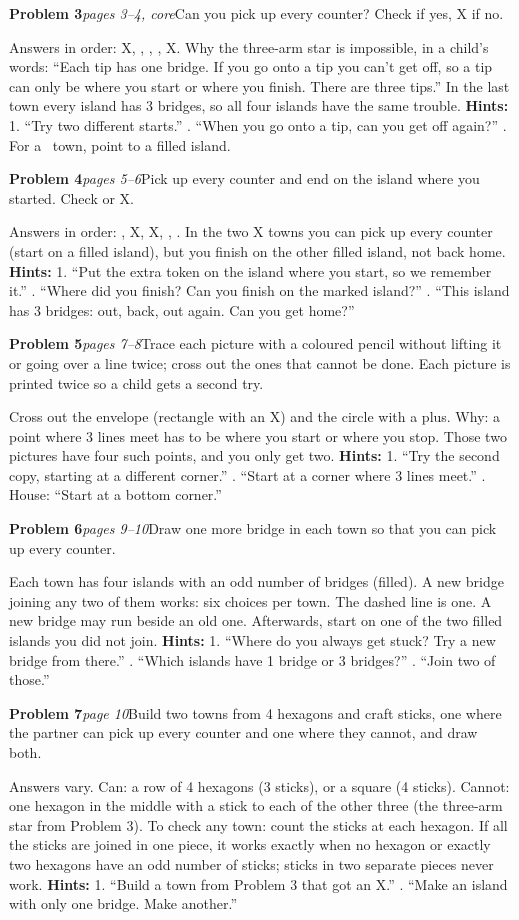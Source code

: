 \documentclass[10pt]{article}
\newcommand{\kprob}[3]{\par\needspace{14\baselineskip}\vspace{3pt}\noindent\textbf{#1}\enspace\textit{#2}\enspace #3\par}
\newcommand{\hints}[1]{\noindent\textbf{Hints:} #1\par}
\newcommand{\ck}{\checkmark}
\begin{document}
\kprob{Problem 3}{pages 3--4, core}{Can you pick up every counter? Check if yes, X if no.}

Answers in order: X, \ck, \ck, \ck, X. Why the three-arm star is impossible, in a child's words: ``Each tip has one bridge. If you go onto a tip you can't get off, so a tip can only be where you start or where you finish. There are three tips.'' In the last town every island has 3 bridges, so all four islands have the same trouble.
\hints{1. ``Try two different starts.'' . ``When you go onto a tip, can you get off again?'' \;3. For a \ck\ town, point to a filled island.}

\kprob{Problem 4}{pages 5--6}{Pick up every counter and end on the island where you started. Check or X.}

Answers in order: \ck, X, X, \ck, \ck. In the two X towns you can pick up every counter (start on a filled island), but you finish on the other filled island, not back home.
\hints{1. ``Put the extra token on the island where you start, so we remember it.'' \;2. ``Where did you finish? Can you finish on the marked island?'' \;3. ``This island has 3 bridges: out, back, out again. Can you get home?''}

\kprob{Problem 5}{pages 7--8}{Trace each picture with a coloured pencil without lifting it or going over a line twice; cross out the ones that cannot be done. Each picture is printed twice so a child gets a second try.}

Cross out the envelope (rectangle with an X) and the circle with a plus. Why: a point where 3 lines meet has to be where you start or where you stop. Those two pictures have four such points, and you only get two.
\hints{1. ``Try the second copy, starting at a different corner.'' \;2. ``Start at a corner where 3 lines meet.'' \;3. House: ``Start at a bottom corner.''}

\kprob{Problem 6}{pages 9--10}{Draw one more bridge in each town so that you can pick up every counter.}

Each town has four islands with an odd number of bridges (filled). A new bridge joining any two of them works: six choices per town. The dashed line is one. A new bridge may run beside an old one. Afterwards, start on one of the two filled islands you did not join.
\hints{1. ``Where do you always get stuck? Try a new bridge from there.'' \;2. ``Which islands have 1 bridge or 3 bridges?'' \;3. ``Join two of those.''}

\kprob{Problem 7}{page 10}{Build two towns from 4 hexagons and craft sticks, one where the partner can pick up every counter and one where they cannot, and draw both.}
Answers vary. Can: a row of 4 hexagons (3 sticks), or a square (4 sticks). Cannot: one hexagon in the middle with a stick to each of the other three (the three-arm star from Problem 3). To check any town: count the sticks at each hexagon. If all the sticks are joined in one piece, it works exactly when no hexagon or exactly two hexagons have an odd number of sticks; sticks in two separate pieces never work.
\hints{1. ``Build a town from Problem 3 that got an X.'' . ``Make an island with only one bridge. Make another.''}
\end{document}
